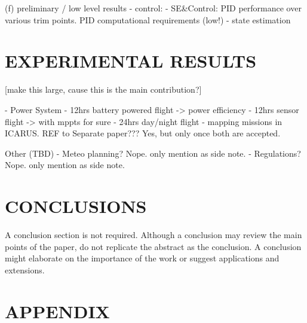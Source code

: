 \documentclass[letterpaper, 10 pt, conference]{ieeeconf}  %
\begin{document}
 (f) preliminary / low level results
  - control:   - SE\&Control: PID performance over various trim points. PID computational requirements (low!)
  - state estimation
 
 \section{EXPERIMENTAL RESULTS}
 
 [make this large, cause this is the main contribution?]

  - Power System
  - 12hrs battery powered flight -> power efficiency
  - 12hrs sensor flight -> with mppts for sure
  - 24hrs day/night flight
  - mapping missions in ICARUS. REF to Separate paper??? Yes, but only once both are accepted.
    
 Other (TBD)
  - Meteo planning? Nope. only mention as side note.
  - Regulations? Nope. only mention as side note.
   
\section{CONCLUSIONS}

A conclusion section is not required. Although a conclusion may review the main points of the paper, do not replicate the abstract as the conclusion. A conclusion might elaborate on the importance of the work or suggest applications and extensions. 

\addtolength{\textheight}{-12cm}   %







\section*{APPENDIX}
\end{document}
